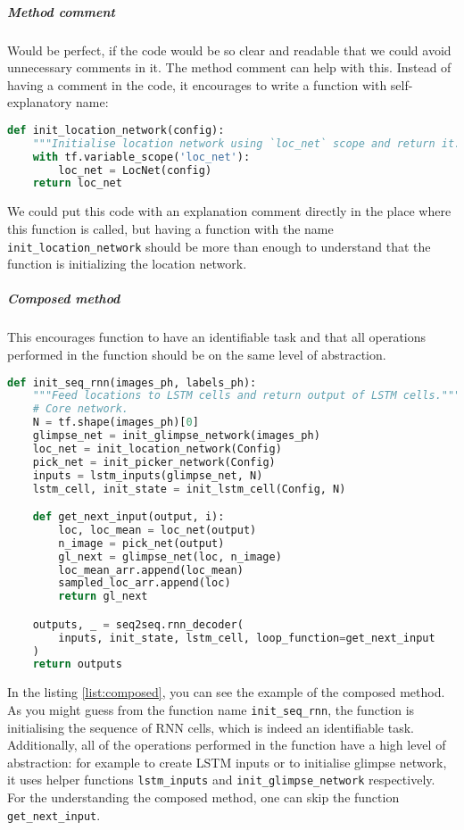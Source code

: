 \subparagraph{Method comment} Would be perfect, if the code would
be so clear and readable that we could avoid unnecessary comments in it.
The method comment can help with this. Instead of having a comment in the code,
it encourages to write a function with self-explanatory name:
\begin{lstlisting}[language=Python, caption={Method comment example},label={list:method_comment}]
def init_location_network(config):
    """Initialise location network using `loc_net` scope and return it."""
    with tf.variable_scope('loc_net'):
        loc_net = LocNet(config)
    return loc_net
\end{lstlisting}

We could put this code  with an explanation
comment directly in the place where this function is called, but having
a function with the name \lstinline{init_location_network} should be more than enough
to understand that the function is initializing the location network.

\subparagraph{Composed method} This encourages function to have an identifiable
task and that all operations performed in the function should be on the same
level of abstraction.

\begin{lstlisting}[language=Python, caption={Method comment example},label={list:composed}]
def init_seq_rnn(images_ph, labels_ph):
    """Feed locations to LSTM cells and return output of LSTM cells."""
    # Core network.
    N = tf.shape(images_ph)[0]
    glimpse_net = init_glimpse_network(images_ph)
    loc_net = init_location_network(Config)
    pick_net = init_picker_network(Config)
    inputs = lstm_inputs(glimpse_net, N)
    lstm_cell, init_state = init_lstm_cell(Config, N)

    def get_next_input(output, i):
        loc, loc_mean = loc_net(output)
        n_image = pick_net(output)
        gl_next = glimpse_net(loc, n_image)
        loc_mean_arr.append(loc_mean)
        sampled_loc_arr.append(loc)
        return gl_next

    outputs, _ = seq2seq.rnn_decoder(
        inputs, init_state, lstm_cell, loop_function=get_next_input
    )
    return outputs
\end{lstlisting}

In the listing \ref{list:composed}, you can see the example of the composed method.
As you might guess from the function name \lstinline{init_seq_rnn}, the
function
is initialising the sequence of \gls{RNN} cells, which is indeed an identifiable task.
Additionally, all of the operations performed in the function
have a high level of abstraction: for example to
create \gls{LSTM} inputs or to initialise glimpse network, it uses helper functions
\lstinline{lstm_inputs} and \lstinline{init_glimpse_network} respectively.
For the understanding the composed method, one can skip the function \lstinline{get_next_input}.


